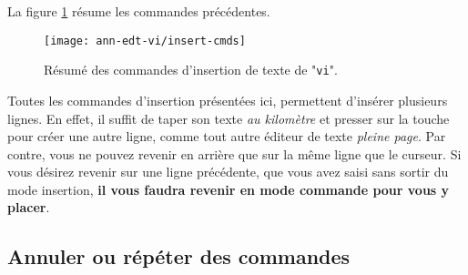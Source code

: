 La figure \ref{ann-edt-vi-insert-fig} r{\'e}sume les commandes
pr{\'e}c{\'e}dentes.

\begin{figure}[hbtp]
\texttt{[image: ann-edt-vi/insert-cmds]}
\caption{\label{ann-edt-vi-insert-fig}R{\'e}sum{\'e} des commandes d'insertion
	de texte de "{\tt vi}".}
\end{figure}

\begin{remarque}
Toutes les commandes d'insertion pr{\'e}sent{\'e}es ici, permettent
d'ins{\'e}rer plusieurs lignes. En effet, il suffit de taper son texte
{\it au kilom{\`e}tre} et presser sur la touche {\returnkey} pour
cr{\'e}er une autre ligne, comme tout autre {\'e}diteur de texte
{\it pleine page}. Par contre, vous ne pouvez revenir en arri{\`e}re que sur
la m{\^e}me ligne que le curseur. Si vous d{\'e}sirez revenir sur une
ligne pr{\'e}c{\'e}dente, que vous avez saisi sans sortir du mode
insertion, {\bf il vous faudra revenir en mode commande pour vous y
placer}.
\end{remarque}


\subsection{\label{ann-edt-vi-undo}Annuler ou r{\'e}p{\'e}ter des commandes}

